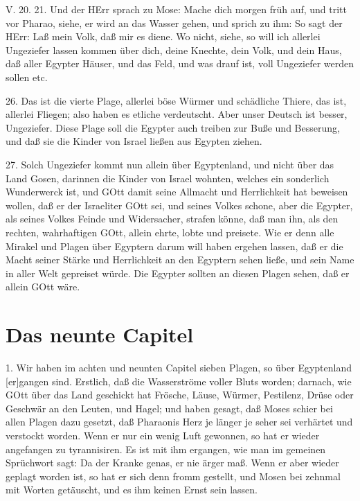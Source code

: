 \begin{schriftzitat}
V. 20. 21. Und der HErr sprach zu Mose: Mache dich morgen früh auf, und tritt vor Pharao, siehe, er wird an das Wasser gehen, und sprich zu ihm: So sagt der HErr: Laß mein Volk, daß mir es diene. Wo nicht, siehe, so will ich allerlei Ungeziefer lassen kommen über dich, deine Knechte, dein Volk, und dein Haus, daß aller Egypter Häuser, und das Feld, und was drauf ist, voll Ungeziefer werden sollen etc.
\end{schriftzitat}

26. Das ist die vierte Plage, allerlei böse Würmer und schädliche Thiere, das ist, allerlei Fliegen; also haben es etliche verdeutscht. Aber unser Deutsch ist besser, Ungeziefer. Diese Plage soll die Egypter auch treiben zur Buße und Besserung, und daß sie die Kinder von Israel ließen aus Egypten ziehen.

27. Solch Ungeziefer kommt nun allein über Egyptenland, und nicht über das Land Gosen, darinnen die Kinder von Israel wohnten, welches ein sonderlich Wunderwerck ist, und GOtt damit seine Allmacht und Herrlichkeit hat beweisen wollen, daß er der Israeliter GOtt sei, und seines Volkes schone, aber die Egypter, als seines Volkes Feinde und Widersacher, strafen könne, daß man ihn, als den rechten, wahrhaftigen GOtt, allein ehrte, lobte und preisete. Wie er denn alle Mirakel und Plagen über Egyptern darum will haben ergehen lassen, daß er die Macht seiner Stärke und Herrlichkeit an den Egyptern sehen ließe, und sein Name in aller Welt gepreiset würde. Die Egypter sollten an diesen Plagen sehen, daß er allein GOtt wäre.

\section{Das neunte Capitel}

1. Wir haben im achten und neunten Capitel sieben Plagen, so über Egyptenland [er]gangen sind. Erstlich, daß die Wasserströme voller Bluts worden; darnach, wie GOtt über das Land geschickt hat Frösche, Läuse, Würmer, Pestilenz, Drüse oder Geschwär an den Leuten, und Hagel; und haben gesagt, daß Moses schier bei allen Plagen dazu gesetzt, daß Pharaonis Herz je länger je seher sei verhärtet und verstockt worden. Wenn er nur ein wenig Luft gewonnen, so hat er wieder angefangen zu tyrannisiren. Es ist mit ihm ergangen, wie man im gemeinen Sprüchwort sagt: Da der Kranke genas, er nie ärger maß. Wenn er aber wieder geplagt worden ist, so hat er sich denn fromm gestellt, und Mosen bei zehnmal mit Worten getäuscht, und es ihm keinen Ernst sein lassen.

